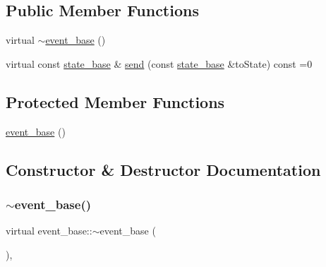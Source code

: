\subsection*{Public Member Functions}
\begin{DoxyCompactItemize}
\item 
virtual \mbox{\hyperlink{classevent__base_a0b6ea7f1b1525f5ae0d4ef916440f8fb}{$\sim$event\+\_\+base}} ()
\item 
virtual const \mbox{\hyperlink{classstate__base}{state\+\_\+base}} \& \mbox{\hyperlink{classevent__base_aa145c3849ff0fa69e656cb88a5de80a7}{send}} (const \mbox{\hyperlink{classstate__base}{state\+\_\+base}} \&to\+State) const =0
\end{DoxyCompactItemize}
\subsection*{Protected Member Functions}
\begin{DoxyCompactItemize}
\item 
\mbox{\hyperlink{classevent__base_ae702d6271d650ae8b6b26afa0f44fc00}{event\+\_\+base}} ()
\end{DoxyCompactItemize}


\subsection{Constructor \& Destructor Documentation}
\mbox{\label{classevent__base_a0b6ea7f1b1525f5ae0d4ef916440f8fb}} 
\subsubsection{\texorpdfstring{$\sim$event\+\_\+base()}{~event\_base()}}
{\footnotesize\ttfamily virtual event\+\_\+base\+::$\sim$event\+\_\+base (\begin{DoxyParamCaption}{ }\end{DoxyParamCaption})\hspace{0.3cm}{\ttfamily [inline]}, {\ttfamily [virtual]}}

\mbox{\label{classevent__base_ae702d6271d650ae8b6b26afa0f44fc00}} 
